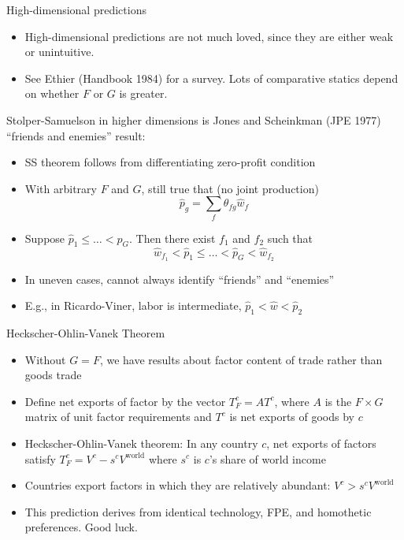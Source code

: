 \documentclass[10pt,notes=hide]{beamer}
\begin{document}
\begin{frame}{High-dimensional predictions}
\begin{itemize}
	\item High-dimensional predictions are not much loved, since they are either weak or unintuitive.
	\item See Ethier (Handbook 1984) for a survey. Lots of comparative statics depend on whether $F$ or $G$ is greater.
\end{itemize}
Stolper-Samuelson in higher dimensions is Jones and Scheinkman (JPE 1977) ``friends and enemies'' result:
\begin{itemize}
	\item SS theorem follows from differentiating zero-profit condition
	\item With arbitrary $F$ and $G$, still true that (no joint production)
	\begin{equation*}
		\hat{p}_g = \sum_f \theta_{fg} \hat{w}_f
	\end{equation*}
	\item Suppose $\hat{p}_1 \leq \dots < \hat{p}_G$. 
	Then there exist $f_1$ and $f_2$ such that 
	\begin{equation*}
		\hat{w}_{f_1} <  \hat{p}_1 \leq \dots < \hat{p}_G < \hat{w}_{f_2}
	\end{equation*}
	\item In uneven cases, cannot always identify ``friends'' and ``enemies''
	\item E.g., in Ricardo-Viner, labor is intermediate, $\hat{p}_1 < \hat{w} < \hat{p}_2$
\end{itemize}
\end{frame}
\begin{frame}{Heckscher-Ohlin-Vanek Theorem}
\begin{itemize}
	\item Without $G=F$, we have results about factor content of trade rather than goods trade
	\item Define net exports of factor by the vector $T_{F}^{c} = AT^c$, where $A$ is the $F \times G$ matrix of unit factor requirements and $T^c$ is net exports of goods by $c$
	\item Heckscher-Ohlin-Vanek theorem: In any country $c$, net exports of factors satisfy $T_F^c = V^c - s^c V^{\text{world}}$ where $s^c$ is $c$'s share of world income
	\item Countries export factors in which they are relatively abundant: $V^c > s^c V^{\text{world}}$ 
	\item This prediction derives from identical technology, FPE, and homothetic preferences.
	Good luck.
\end{itemize}
\end{frame}
\end{document}
